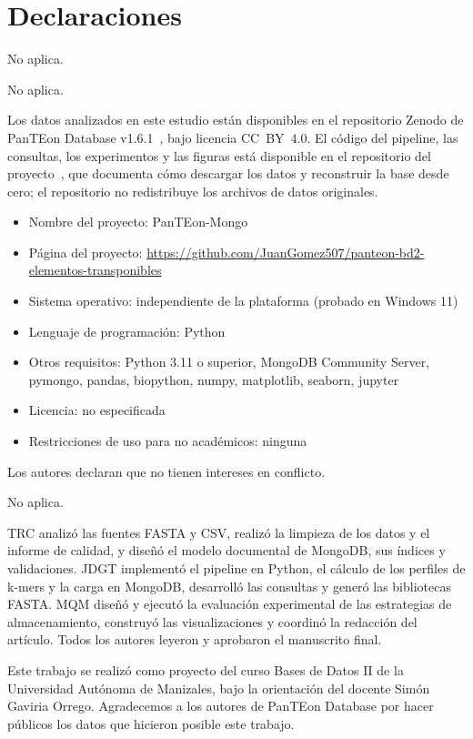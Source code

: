 \documentclass[pdflatex,sn-vancouver-num,lineno,referee]{sn-jnl}
\begin{document}
\backmatter

\section*{Declaraciones}

No aplica.

No aplica.

Los datos analizados en este estudio están disponibles en el repositorio
Zenodo de PanTEon Database v1.6.1~\cite{panteon2026zenodo}, bajo licencia
CC~BY~4.0. El código del pipeline, las consultas, los experimentos y las
figuras está disponible en el repositorio del proyecto~\cite{repo2026}, que
documenta cómo descargar los datos y reconstruir la base desde cero; el
repositorio no redistribuye los archivos de datos originales.
\begin{itemize}
\item Nombre del proyecto: PanTEon-Mongo
\item Página del proyecto: \url{https://github.com/JuanGomez507/panteon-bd2-elementos-transponibles}
\item Sistema operativo: independiente de la plataforma (probado en Windows 11)
\item Lenguaje de programación: Python
\item Otros requisitos: Python 3.11 o superior, MongoDB Community Server, pymongo, pandas, biopython, numpy, matplotlib, seaborn, jupyter
\item Licencia: no especificada
\item Restricciones de uso para no académicos: ninguna
\end{itemize}

Los autores declaran que no tienen intereses en conflicto.

No aplica.

TRC analizó las fuentes FASTA y CSV, realizó la limpieza de los datos y el
informe de calidad, y diseñó el modelo documental de MongoDB, sus índices y
validaciones. JDGT implementó el pipeline en Python, el cálculo de los
perfiles de k-mers y la carga en MongoDB, desarrolló las consultas y generó
las bibliotecas FASTA. MQM diseñó y ejecutó la evaluación experimental de las
estrategias de almacenamiento, construyó las visualizaciones y coordinó la
redacción del artículo. Todos los autores leyeron y aprobaron el manuscrito
final.

Este trabajo se realizó como proyecto del curso Bases de Datos II de la
Universidad Autónoma de Manizales, bajo la orientación del docente Simón
Gaviria Orrego. Agradecemos a los autores de PanTEon Database por hacer
públicos los datos que hicieron posible este trabajo.


\end{document}

